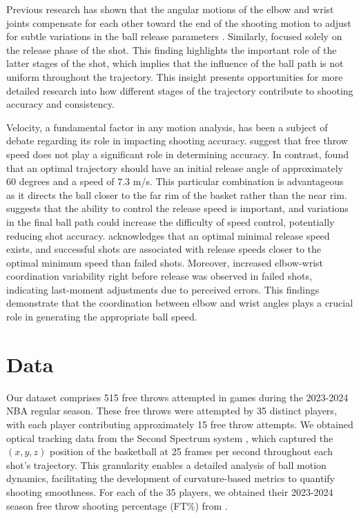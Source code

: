 \documentclass{article}
\begin{document}
      Previous research has shown that the angular motions of the elbow and wrist joints compensate for each other toward the end of the shooting motion to adjust for subtle variations in the ball release parameters \citep{button_examining_2003}. Similarly, \citet{tran_optimal_2008} focused solely on the release phase of the shot. This finding highlights the important role of the latter stages of the shot, which implies that the influence of the ball path is not uniform throughout the trajectory. This insight presents opportunities for more detailed research into how different stages of the trajectory contribute to shooting accuracy and consistency.

      Velocity, a fundamental factor in any motion analysis, has been a subject of debate regarding its role in impacting shooting accuracy. \citet{pakosz_muscle_2021} suggest that free throw speed does not play a significant role in determining accuracy. In contrast, \citet{hamilton_optimal_1997} found that an optimal trajectory should have an initial release angle of approximately 60 degrees and a speed of 7.3 m/s. This particular combination is advantageous as it directs the ball closer to the far rim of the basket rather than the near rim. \citet{slegers_role_2024} suggests that the ability to control the release speed is important, and variations in the final ball path could increase the difficulty of speed control, potentially reducing shot accuracy. \citet{mullineaux_coordination-variability_2010} acknowledges that an optimal minimal release speed exists, and successful shots are associated with release speeds closer to the optimal minimum speed than failed shots. Moreover, increased elbow-wrist coordination variability right before release was observed in failed shots, indicating last-moment adjustments due to perceived errors. This findings demonstrate that the coordination between elbow and wrist angles plays a crucial role in generating the appropriate ball speed.
      
  \section{Data}

    Our dataset comprises 515 free throws attempted in games during the 2023-2024 NBA regular season. These free throws were attempted by 35 distinct players, with each player contributing approximately 15 free throw attempts. We obtained optical tracking data from the Second Spectrum system \citep{national_basketball_association_nba_2016}, which captured the $(x, y, z)$ position of the basketball at 25 frames per second throughout each shot's trajectory. This granularity enables a detailed analysis of ball motion dynamics, facilitating the development of curvature-based metrics to quantify shooting smoothness. For each of the 35 players, we obtained their 2023-2024 season free throw shooting percentage (FT\%) from \citet{basketball_reference_2023-24_2024}.
\end{document}
